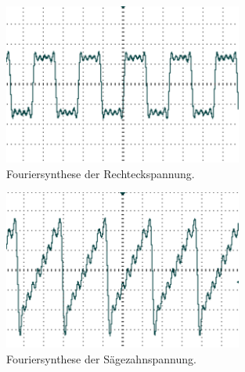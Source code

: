 \begin{figure}
	\centering
		\includegraphics[width=0.7\textwidth]{Bilder/1-9_RE.pdf}		
\caption{Fouriersynthese der Rechteckspannung.}
	\label{fig:1-9_RE}
\end{figure}




\begin{figure}
	\centering
		\includegraphics[width=0.7\textwidth]{Bilder/1-9_SZ.pdf}		
\caption{Fouriersynthese der Sägezahnspannung.}
	\label{fig:1-9_SZ}
\end{figure}


